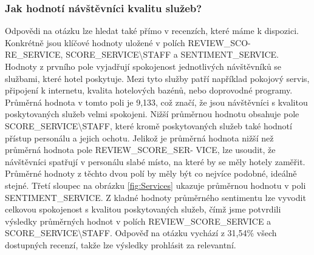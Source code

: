 \documentclass[czech,BP]{thesiskiv}
\begin{document}
\subsubsection{Jak hodnotí návštěvníci kvalitu služeb?}
\label{subsub:služby}
Odpovědi na otázku lze hledat také přímo v recenzích, které máme k dispozici. Konkrétně jsou klíčové hodnoty uložené v polích REVIEW\_SCO- RE\_SERVICE, SCORE\_SERVICE\textbackslash STAFF a SENTIMENT\_SERVICE.\\ Hodnoty z prvního pole vyjadřují spokojenost jednotlivých návštěvníků se službami, které hotel poskytuje. Mezi tyto služby patří například pokojový servis, připojení k internetu, kvalita hotelových bazénů, nebo doprovodné programy. Průměrná hodnota v tomto poli je 9,133, což značí, že jsou návštěvníci s kvalitou poskytovaných služeb velmi spokojeni. Nižší průměrnou hodnotu obsahuje pole SCORE\_SERVICE\textbackslash STAFF, které kromě poskytovaných služeb také hodnotí přístup personálu a jejich ochotu. Jelikož je průměrná hodnota nižší než průměrná hodnota pole REVIEW\_SCORE\_SER- VICE, lze usoudit, že návštěvníci spatřují v personálu slabé místo, na které by se měly hotely zaměřit. Průměrné hodnoty z těchto dvou polí by měly být co nejvíce podobné, ideálně stejné. Třetí sloupec na obrázku \ref{fig:Services} ukazuje průměrnou hodnotu v poli SENTIMENT\_SERVICE. Z kladné hodnoty průměrného sentimentu lze vyvodit celkovou spokojenost s kvalitou poskytovaných služeb, čímž jsme potvrdili výsledky průměrných hodnot v polích REVIEW\_SCORE\_SERVICE a SCORE\_SERVICE\textbackslash STAFF. Odpověď na otázku vychází z 31,54\% všech dostupných recenzí, takže lze výsledky prohlásit za relevantní.
% 
\end{document}
